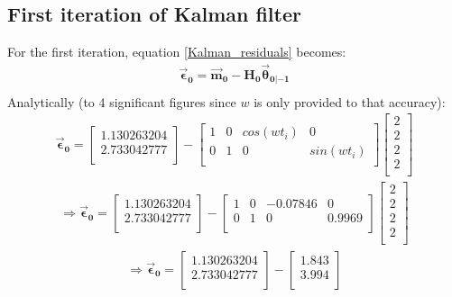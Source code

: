 \documentclass[a4paper]{article}
\begin{document}
	\subsection{First iteration of Kalman filter}\label{First iteration of Kalman filter}
		For the first iteration, equation \ref{Kalman_residuals} becomes:
		\begin{align}
			\bm{\vec{\epsilon}_0}=\bm{\vec{m}_0}-\bm{H_0\vec{\theta}_{0|-1}}\\
		\end{align}
		Analytically (to 4 significant figures since $w$ is only provided to that accuracy):
		\begin{align}
			\bm{\vec{\epsilon}_0}=
			\begin{bmatrix}
				1.130263204 \\
				2.733042777 \\
			\end{bmatrix}-
			\begin{bmatrix}
				1 &	0 &	cos(wt_i) &	0 \\
				0 &	1 &	0 &	sin(wt_i) \\
			\end{bmatrix}
			\begin{bmatrix}
				2 \\
				2 \\
				2 \\
				2 \\
			\end{bmatrix}
		\end{align}
		\begin{align}
			\Rightarrow\bm{\vec{\epsilon}_0}=
			\begin{bmatrix}
				1.130263204 \\
				2.733042777 \\
			\end{bmatrix}-
			\begin{bmatrix}
				1 &	0 &	-0.07846 &	0 \\
				0 &	1 &	0 &				0.9969 \\
			\end{bmatrix}
			\begin{bmatrix}
				2 \\
				2 \\
				2 \\
				2 \\
			\end{bmatrix}
		\end{align}
		\begin{align}
			\Rightarrow\bm{\vec{\epsilon}_0}=
			\begin{bmatrix}
				1.130263204 \\
				2.733042777 \\
			\end{bmatrix}-
			\begin{bmatrix}
				1.843 \\
				3.994 \\
			\end{bmatrix}
		\end{align}
\end{document}
